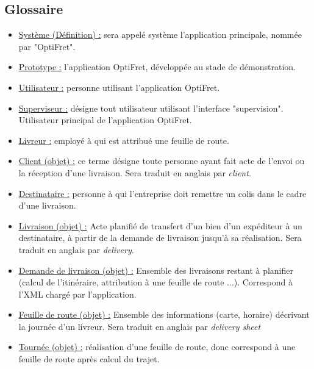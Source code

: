 \documentclass[a4paper]{report}
\begin{document}
\begin{appendices}
    \chapter{Glossaire}

    \begin{itemize}[label = \textbullet, font = \color{orange}]
        \item \underline{Système (Définition) :} sera appelé système
            l'application principale, nommée par "OptiFret".
        \item \underline{Prototype :} l'application OptiFret, développée au
            stade de démonstration.
        \item \underline{Utilisateur :} personne utilisant l'application
            OptiFret.
        \item \underline{Superviseur :} désigne tout utilisateur utilisant
            l'interface "supervision". Utilisateur principal de l'application
            OptiFret.
        \item \underline{Livreur :} employé à qui est attribué une feuille de
            route.
        \item \underline{Client (objet) :}  ce terme désigne toute personne
            ayant fait acte de l'envoi ou la réception d'une livraison. Sera
            traduit en anglais par \emph{client}.
        \item \underline{Destinataire :} personne à qui l'entreprise doit
            remettre un colis dans le cadre d'une livraison.
        \item \underline{Livraison (objet) :} Acte planifié de transfert d'un
            bien d'un expéditeur à un destinataire, à partir de la demande de
            livraison  jusqu'à sa réalisation. Sera traduit en anglais par
            \emph{delivery}.
        \item \underline{Demande de livraison (objet) :} Ensemble des
            livraisons restant à planifier (calcul de l'itinéraire,
            attribution à une feuille de route ...). Correspond à l'XML chargé
            par l'application.
        \item \underline{Feuille de route (objet) :} Ensemble des informations
            (carte, horaire) décrivant la journée d'un livreur. Sera traduit en anglais par \emph{delivery sheet}
        \item \underline{Tournée (objet) :} réalisation d'une feuille de route,
            donc correspond à une feuille de route après calcul du trajet.

\end{itemize}
\end{appendices}
\end{document}
